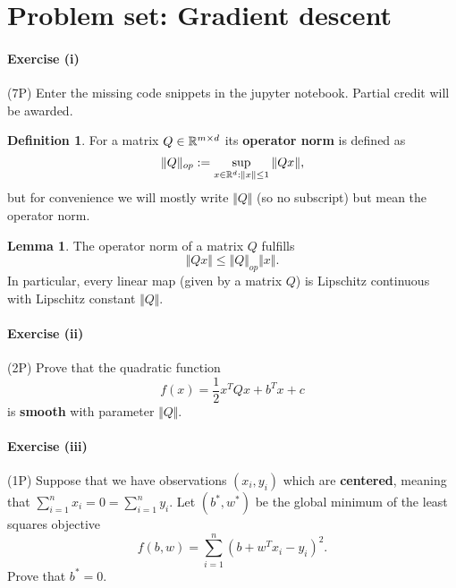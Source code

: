 \documentclass{scrartcl}
\theoremstyle{definition}
\newtheorem{definition}{Definition}[section]
\newtheorem{lemma}{Lemma}[section]
\begin{document}
\section{Problem set: Gradient descent}%


\paragraph{Exercise (i)} (7P) Enter the missing code snippets in the jupyter notebook. Partial credit will be awarded.


\begin{definition}
  For a matrix $Q \in \mathbb{R}^{m \times d}$ its \textbf{operator norm} is defined as
  \begin{equation}
    \Vert Q \Vert_{op} := \sup_{x \in \mathbb{R}^d: \Vert x \Vert \le 1} \Vert Q x \Vert,
  \end{equation}
  but for convenience we will mostly write $\Vert Q \Vert$ (so no subscript) but mean the operator norm.
\end{definition}

\begin{lemma}%
  The operator norm of a matrix $Q$ fulfills
  \begin{equation}
    \Vert Qx \Vert \le \Vert Q \Vert_{op} \Vert x \Vert.
  \end{equation}
  In particular, every linear map (given by a matrix $Q$) is Lipschitz continuous with Lipschitz constant $\Vert Q \Vert$.
\end{lemma}


\paragraph{Exercise (ii)} (2P) Prove that the quadratic function
\begin{equation}
  f(x) = \frac{1}{2} x^T Q x +b^T x + c
\end{equation}
is \textbf{smooth} with parameter $\Vert Q \Vert$.


\paragraph{Exercise (iii)} (1P) Suppose that we have observations $(x_i, y_i)$ which are \textbf{centered}, meaning that $\sum_{i=1}^{n}x_i = 0 = \sum_{i=1}^{n}y_i$. Let $(b^*, w^*)$ be the global minimum of the least squares objective
\begin{equation}
  f(b, w) = \sum_{i=1}^{n} {(b + w^T x_i - y_i)}^2.
\end{equation}
Prove that $b^*=0$.
\end{document}
